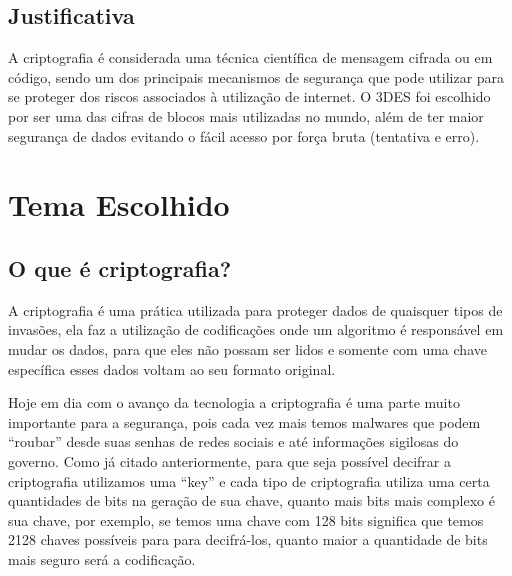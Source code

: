 \newpage
\section{\textbf{Justificativa}}
\par A criptografia é considerada uma técnica científica de mensagem cifrada ou em código, sendo um dos principais mecanismos de segurança que pode utilizar para se proteger dos riscos associados à utilização de internet. O 3DES foi escolhido por ser uma das cifras de blocos mais utilizadas no mundo, além de ter maior segurança de dados evitando o fácil acesso por força bruta (tentativa e erro).

\newpage
\chapter{\textbf{Tema Escolhido}}

\section{\textbf{O que é criptografia?}}
\par A criptografia é uma prática utilizada para proteger dados de quaisquer tipos de invasões, ela faz a utilização de codificações onde um algoritmo é responsável em mudar os dados, para que eles não possam ser lidos e somente com uma chave específica esses dados voltam ao seu formato original.

\par Hoje em dia com o avanço da tecnologia a criptografia é uma parte muito importante para a segurança, pois cada vez mais temos malwares que podem “roubar” desde suas senhas de redes sociais e até informações sigilosas do governo.
Como já citado anteriormente, para que seja possível decifrar a criptografia utilizamos uma “key” e cada tipo de criptografia utiliza uma certa quantidades de bits na geração de sua chave, quanto mais bits mais complexo é sua chave, por exemplo, se temos uma chave com 128 bits significa que temos 2128 chaves possíveis para para decifrá-los, quanto maior a quantidade de bits mais seguro será a codificação.

\newpage
